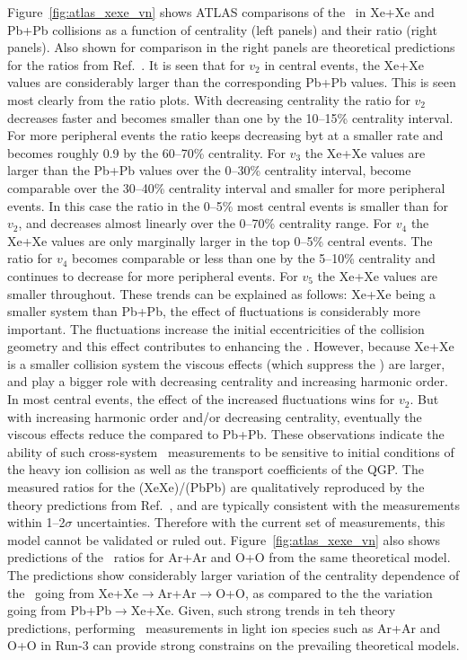 Figure~\ref{fig:atlas_xexe_vn} shows ATLAS comparisons of the \vn\
  in Xe+Xe and Pb+Pb collisions as a function of centrality (left panels)
  and their ratio (right panels).
Also shown for comparison in the right panels are theoretical predictions
  for the ratios from Ref.~\cite{Giacalone:2017dud}.
It is seen that for $v_2$ in central events, the Xe+Xe values are
  considerably larger than the corresponding Pb+Pb values.
This is seen most clearly from the ratio plots.
With decreasing centrality the ratio for $v_2$ decreases faster and
  becomes smaller than one by the 10--15\% centrality interval.
For more peripheral events the ratio keeps decreasing byt at a
  smaller rate and becomes roughly 0.9 by the 60--70\% centrality.
For $v_3$ the Xe+Xe values are larger than the Pb+Pb values
  over the 0--30\% centrality interval,  become comparable over the
  30--40\% centrality interval and smaller for more peripheral events.
In this case the ratio in the 0--5\% most central events is smaller
  than for $v_2$, and decreases almost linearly over the 0--70\%
  centrality range.
For $v_4$ the Xe+Xe values are only marginally larger in the top
  0--5\% central events.
The ratio for $v_4$ becomes comparable or less than one by the
  5--10\% centrality and continues to decrease for
  more peripheral events.
For $v_5$ the Xe+Xe values are smaller throughout.
These trends can be explained as follows:
  Xe+Xe being a smaller system than Pb+Pb, the effect of fluctuations
  is considerably more important.
The fluctuations increase the initial eccentricities of the collision
  geometry and this effect contributes to enhancing the \vn.
However, because Xe+Xe is a smaller collision system the viscous
  effects (which suppress the \vn) are larger, and play a bigger role
  with decreasing centrality and increasing harmonic order.
In most central events, the effect of the increased fluctuations wins
  for $v_2$.
But with increasing harmonic order and/or decreasing centrality, 
  eventually the viscous effects reduce the \vn compared to Pb+Pb.
These observations indicate the ability of such cross-system 
  \vn\ measurements to be sensitive to initial conditions of 
  the heavy ion collision as well as the transport coefficients
  of the QGP. 
The measured ratios for the \vn(XeXe)/\vn(PbPb) are qualitatively reproduced 
  by the theory predictions from Ref.~\cite{Giacalone:2017dud},
	and are typically consistent with the measurements within 1--2$\sigma$
	uncertainties.
Therefore with the current set of measurements, this model cannot be validated
  or ruled out.
Figure~\ref{fig:atlas_xexe_vn} also shows predictions of the \vn\ ratios
  for Ar+Ar and O+O from the same theoretical model.
The predictions show considerably larger variation of the centrality dependence
  of the \vn\ going from Xe+Xe$\rightarrow$Ar+Ar$\rightarrow$O+O, as compared to
	the the variation going from Pb+Pb$\rightarrow$Xe+Xe.
Given, such strong trends in teh theory predictions, performing \vn\ measurements 
  in light ion species such as Ar+Ar and O+O in Run-3 can provide strong 
  constrains on the prevailing theoretical models.

